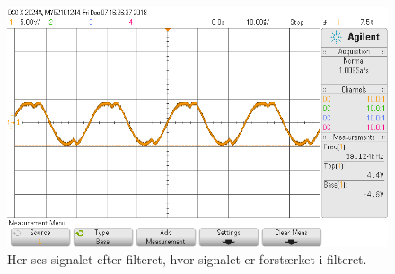\begin{figure}[h!]
	\centering
	\includegraphics[width=1\textwidth]{billeder/filter_out_png.png}
	\caption{Her ses signalet efter filteret, hvor signalet er forstærket i filteret.}
	\label{fig:filter_out}
\end{figure}